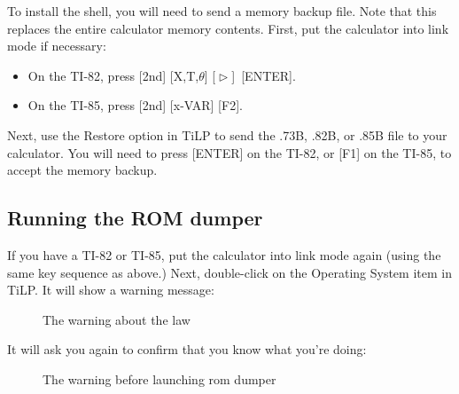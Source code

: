 \documentclass[10pt]{report}
\newcommand{\calckey}[1]{\textsf{[#1]}}
\newcommand{\calcrightarrow}{\calckey{$\vartriangleright$}}
\begin{document}
To install the shell, you will need to send a memory backup file.
Note that this replaces the entire calculator memory contents.  First,
put the calculator into link mode if necessary:
\begin{itemize}
\item On the TI-82, press
  \calckey{2nd} \calckey{X,T,$\theta$} \calcrightarrow\ \calckey{ENTER}.
\item On the TI-85, press
  \calckey{2nd} \calckey{x-VAR} \calckey{F2}.
\end{itemize}
Next, use the \textsf{Restore} option in TiLP to send the .73B, .82B,
or .85B file to your calculator.  You will need to press
\calckey{ENTER} on the TI-82, or \calckey{F1} on the TI-85, to accept
the memory backup.

\subsection*{Running the ROM dumper}
If you have a TI-82 or TI-85, put the calculator into link mode again
(using the same key sequence as above.)  Next, double-click on the
\textsf{Operating System} item in TiLP\@.  It will show a warning message:
\begin{figure}[H]
\centering
{}
\caption{The warning about the law}
\end{figure}
It will ask you again to confirm that you know what you're doing:
\begin{figure}[H]
\centering
{}
\caption{The warning before launching rom dumper}
\end{figure}
\end{document}

